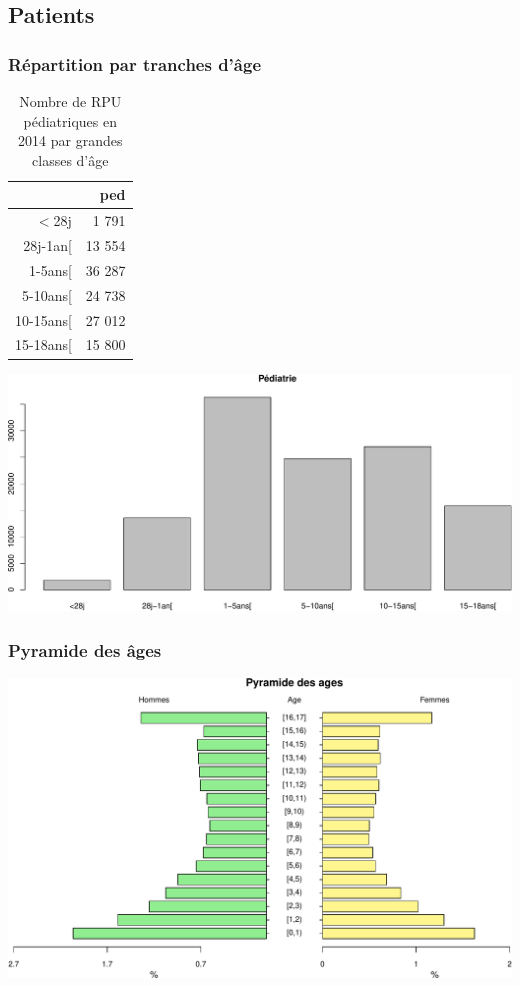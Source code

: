 \documentclass[]{article}
\begin{document}
\subsection{Patients}\label{patients-1}

\subsubsection{Répartition par tranches
d'âge}\label{repartition-par-tranches-dage}

\begin{table}[ht]
\centering
\begin{tabular}{rr}
  \hline
 & ped \\ 
  \hline
$<$28j & 1 791 \\ 
  28j-1an[ & 13 554 \\ 
  1-5ans[ & 36 287 \\ 
  5-10ans[ & 24 738 \\ 
  10-15ans[ & 27 012 \\ 
  15-18ans[ & 15 800 \\ 
   \hline
\end{tabular}
\caption{Nombre de RPU pédiatriques en 2014 par grandes classes d'âge} 
\end{table}

\includegraphics{Figs/unnamed-chunk-7-1.pdf}

\subsubsection{Pyramide des âges}\label{pyramide-des-ages}

\includegraphics{Figs/unnamed-chunk-8-1.pdf}
\end{document}

